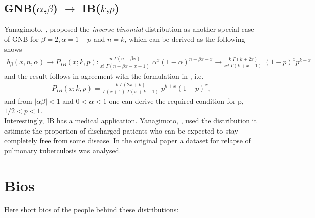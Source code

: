\subsection*{GNB($\alpha$,$\beta$) $\rightarrow$ IB($k$,$p$)}
Yanagimoto, \cite{yanagimoto1989inverse}, proposed the \emph{inverse binomial} 
distribution as another special case of GNB for $\beta = 2, \alpha=1-p$ and $n=k$, which 
can be derived as the following shows 
\begin{align*}
b_{\beta}(x,n,\alpha) \rightarrow P_{I\!B}(x;k,p):
 \frac{n \; \Gamma(n+\beta x)}{x! \;\Gamma(n + \beta x - x +1)}  \; \alpha^x (1-\alpha)^{n+\beta x-x} \rightarrow 
\frac{k \; \Gamma(k + 2x)}{x! \;\Gamma(k + x + 1)}  \; (1-p)^x p^{k+x} 
\end{align*}
and the result follows in agreement with the formulation in \cite{yanagimoto1989inverse}, i.e.
\begin{align*}
P_{I\!B}(x;k,p) = \frac{k \; \Gamma(2x + k)}{\Gamma(x+1) \;\Gamma(x + k + 1)}  \; p^{k+x} (1-p)^x ,
\end{align*}
and from $|\alpha \beta| < 1$ and $0<\alpha<1$ one can derive the required condition for p, $1/2 < p < 1$.\\
Interestingly, IB has a medical application. Yanagimoto, \cite{yanagimoto1989inverse}, 
used the distribution it estimate the proportion of discharged patients who can be 
expected to stay completely free from some disease. In the original paper a dataset
for relapse of pulmonary tuberculosis was analysed.



\section*{Bios}
Here short bios of the people behind these distributions:

